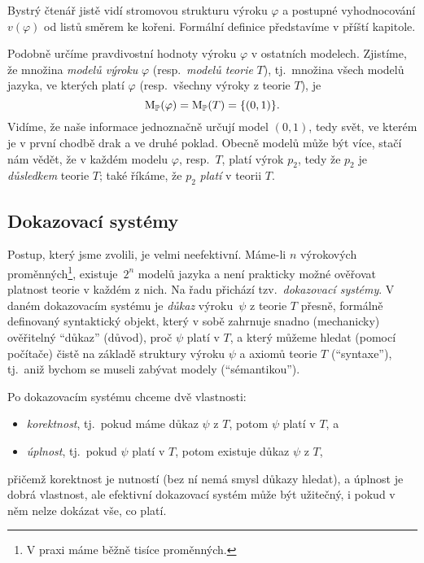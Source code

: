 Bystrý čtenář jistě vidí stromovou strukturu výroku \( \varphi \) a postupné vyhodnocování \( v(\varphi) \) od listů směrem ke kořeni. Formální definice představíme v příští kapitole.

Podobně určíme pravdivostní hodnoty výroku \( \varphi \) v ostatních modelech. Zjistíme, že množina \emph{modelů výroku} \( \varphi \) (resp.\ \emph{modelů teorie} \( T \)), tj.\ množina všech modelů jazyka, ve kterých platí \( \varphi \) (resp.\ všechny výroky z teorie \( T \)), je
\[	
    \operatorname{M}_\mathbb P(\varphi)=\operatorname{M}_\mathbb P(T)=\{(0,1)\}.
\]
Vidíme, že naše informace jednoznačně určují model \( (0,1) \), tedy svět, ve kterém je v první chodbě drak a ve druhé poklad. Obecně modelů může být více, stačí nám vědět, že v každém modelu \( \varphi \), resp.{\ }\(T \), platí výrok \( p_2 \), tedy že \( p_2 \) je \emph{důsledkem} teorie \( T \); také říkáme, že \( p_2 \) \emph{platí} v teorii \( T \).


\subsection{Dokazovací systémy}

Postup, který jsme zvolili, je velmi neefektivní. Máme-li \( n \) výrokových proměnných\footnote{V praxi máme běžně tisíce proměnných.}, existuje~\( 2^n \) modelů jazyka a není prakticky možné ověřovat platnost teorie v každém z nich. Na řadu přichází tzv.\ \emph{dokazovací systémy}. V daném dokazovacím systému je \emph{důkaz} výroku~\( \psi \) z teorie \(T\) přesně, formálně definovaný syntaktický objekt, který v sobě zahrnuje snadno (mechanicky) ověřitelný ``důkaz'' (důvod), proč \( \psi \) platí v \(T\), a který můžeme hledat (pomocí počítače) čistě na základě struktury výroku \( \psi \) a axiomů teorie \(T\) (``syntaxe''), tj.\ aniž bychom se museli zabývat modely (``sémantikou'').

Po dokazovacím systému chceme dvě vlastnosti: 
\begin{itemize}
    \item \emph{korektnost}, tj.\ pokud máme důkaz \( \psi \) z \(T\), potom \( \psi \) platí v \(T\), a
    \item \emph{úplnost}, tj.\ pokud \( \psi \) platí v \(T\), potom existuje důkaz \( \psi \) z \(T\),
\end{itemize}
přičemž korektnost je nutností (bez ní nemá smysl důkazy hledat), a úplnost je dobrá vlastnost, ale efektivní dokazovací systém může být užitečný, i pokud v něm nelze dokázat vše, co platí.

